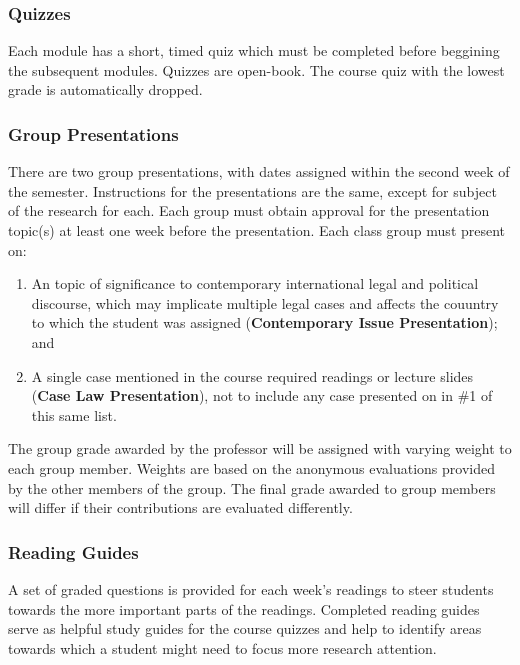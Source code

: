 \documentclass[10pt,]{article}
\providecommand{\tightlist}{%
  \setlength{\itemsep}{0pt}\setlength{\parskip}{0pt}}
\begin{document}
\hypertarget{quizzes}{%
\subsubsection{Quizzes}\label{quizzes}}

Each module has a short, timed quiz which must be completed before
beggining the subsequent modules. Quizzes are open-book. The course quiz
with the lowest grade is automatically dropped.

\hypertarget{group-presentations}{%
\subsubsection{Group Presentations}\label{group-presentations}}

There are two group presentations, with dates assigned within the second
week of the semester. Instructions for the presentations are the same,
except for subject of the research for each. Each group must obtain
approval for the presentation topic(s) at least one week before the
presentation. Each class group must present on:

\begin{enumerate}
\def\labelenumi{\arabic{enumi}.}
\tightlist
\item
  An topic of significance to contemporary international legal and
  political discourse, which may implicate multiple legal cases and
  affects the couuntry to which the student was assigned
  (\textbf{Contemporary Issue Presentation}); and
\item
  A single case mentioned in the course required readings or lecture
  slides (\textbf{Case Law Presentation}), not to include any case
  presented on in \#1 of this same list.
\end{enumerate}

The group grade awarded by the professor will be assigned with varying
weight to each group member. Weights are based on the anonymous
evaluations provided by the other members of the group. The final grade
awarded to group members will differ if their contributions are
evaluated differently.

\hypertarget{reading-guides}{%
\subsubsection{Reading Guides}\label{reading-guides}}

A set of graded questions is provided for each week's readings to steer
students towards the more important parts of the readings. Completed
reading guides serve as helpful study guides for the course quizzes and
help to identify areas towards which a student might need to focus more
research attention.
\end{document}
